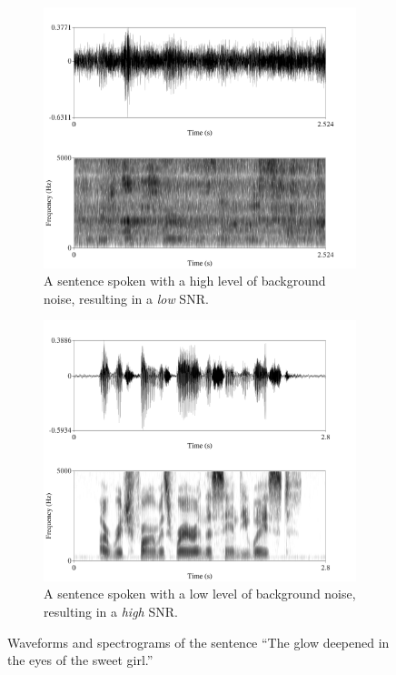 \begin{figure}[h!]
\centering
\begin{subfigure}{0.75\textwidth}
  \includegraphics[width=.9\textwidth]{figure/signal-SNR-intro-low.png}
  \caption{A sentence spoken with a high level of background noise, resulting in a \textit{low} SNR.}
  \label{fig:signal-SNR-intro-low}
\end{subfigure}
%
\begin{subfigure}{0.75\textwidth}
  \includegraphics[width=.9\textwidth]{figure/signal-SNR-intro-high.png}
  \caption{A sentence spoken with a low level of background noise, resulting in a \textit{high} SNR.}
  \label{fig:signal-SNR-intro-high}
\end{subfigure}
\caption{Waveforms and spectrograms of the sentence ``The glow deepened in the eyes of the sweet girl.''}
\label{fig:signal-SNR-intro}
\end{figure}

